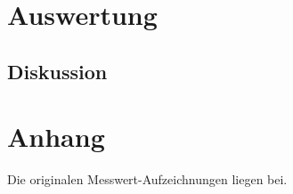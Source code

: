 \documentclass[numbers=noenddot,12pt,a4paper]{scrartcl}
\begin{document}
\section{Auswertung}
\subsection{Diskussion}
\section{Anhang}
Die originalen Messwert-Aufzeichnungen liegen bei.
\end{document}
